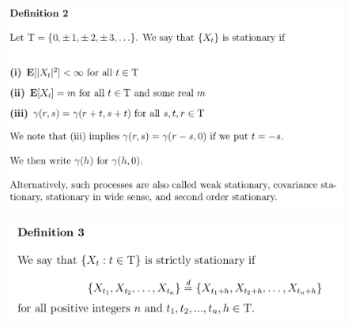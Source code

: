 \documentclass[c, dvipsnames, 8pt]{beamer}
\begin{document}
\begin{frame}[shrink=5]


\frametitle{\insertsection} 
\begin{figure}
	\centering
	\includegraphics[width=1\linewidth]{screenshot004}
	\label{fig:screenshot001}
\end{figure}

\begin{figure}
	\includegraphics[width=0.9\linewidth,left]{screenshot006}
	\label{fig:screenshot001}
\end{figure}




\end{frame}
\end{document}

